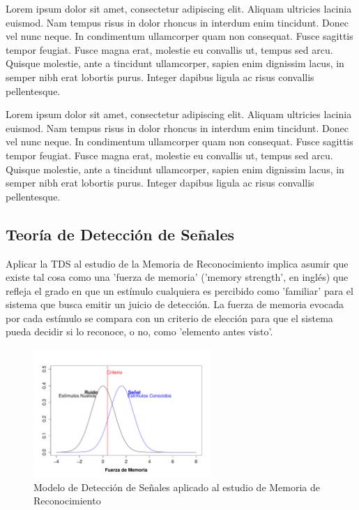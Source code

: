 Lorem ipsum dolor sit amet, consectetur adipiscing elit. Aliquam ultricies lacinia euismod. Nam tempus risus in dolor rhoncus in interdum enim tincidunt. Donec vel nunc neque. In condimentum ullamcorper quam non consequat. Fusce sagittis tempor feugiat. Fusce magna erat, molestie eu convallis ut, tempus sed arcu. Quisque molestie, ante a tincidunt ullamcorper, sapien enim dignissim lacus, in semper nibh erat lobortis purus. Integer dapibus ligula ac risus convallis 
pellentesque.

Lorem ipsum dolor sit amet, consectetur adipiscing elit. Aliquam ultricies lacinia euismod. Nam tempus risus in dolor rhoncus in interdum enim tincidunt. Donec vel nunc neque. In condimentum ullamcorper quam non consequat. Fusce sagittis tempor feugiat. Fusce magna erat, molestie eu convallis ut, tempus sed arcu. Quisque molestie, ante a tincidunt ullamcorper, sapien enim dignissim lacus, in semper nibh erat lobortis purus. Integer dapibus ligula ac risus convallis pellentesque.

\subsection{Teoría de Detección de Señales}
Aplicar la TDS al estudio de la Memoria de Reconocimiento implica asumir que existe tal cosa como una 'fuerza de memoria' ('memory strength', en inglés) que refleja el grado en que un estímulo cualquiera es percibido como 'familiar' para el sistema que busca emitir un juicio de detección. La fuerza de memoria evocada por cada estímulo se compara con un criterio de elección para que el sistema pueda decidir si lo reconoce, o no, como 'elemento antes visto'.\\ 

\begin{figure}[th]
\centering
\includegraphics[width=0.60\textwidth]{Figures/RM_SDT_1} 
\decoRule
\caption[SDT en Memoria de Reconocimiento]{Modelo de Detección de Señales aplicado al estudio de Memoria de Reconocimiento}
\label{fig:RM_SDT_1}
\end{figure}

